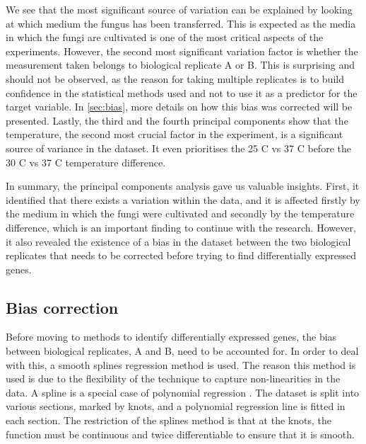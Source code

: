 \documentclass[11pt,twoside]{article}
\numberwithin{Theorem}{section}
\numberwithin{Definition}{section}
\numberwithin{Lemma}{section}
\numberwithin{Algorithm}{section}
\numberwithin{equation}{section}
\begin{document}
We see that the most significant source of variation can be explained by looking at which medium the fungus has been transferred. This is expected as the media in which the fungi are cultivated is one of the most critical aspects of the experiments. However, the second most significant variation factor is whether the measurement taken belongs to biological replicate A or B. This is surprising and should not be observed, as the reason for taking multiple replicates is to build confidence in the statistical methods used and not to use it as a predictor for the target variable. In \autoref{sec:bias}, more details on how this bias was corrected will be presented. Lastly, the third and the fourth principal components show that the temperature, the second most crucial factor in the experiment, is a significant source of variance in the dataset. It even prioritises the 25 C vs 37 C before the 30 C vs 37 C temperature difference.

In summary, the principal components analysis gave us valuable insights. First, it identified that there exists a variation within the data, and it is affected firstly by the medium in which the fungi were cultivated and secondly by the temperature difference, which is an important finding to continue with the research. However, it also revealed the existence of a bias in the dataset between the two biological replicates that needs to be corrected before trying to find differentially expressed genes.

\subsection{Bias correction}
\label{sec:bias}

Before moving to methods to identify differentially expressed genes, the bias between biological replicates, A and B, need to be accounted for. In order to deal with this, a smooth splines regression method is used. The reason this method is used is due to the flexibility of the technique to capture non-linearities in the data. A spline is a special case of polynomial regression \cite{ridgeway2007all}. The dataset is split into various sections, marked by knots, and a polynomial regression line is fitted in each section. The restriction of the splines method is that at the knots, the function must be continuous and twice differentiable to ensure that it is smooth. 
\end{document}
